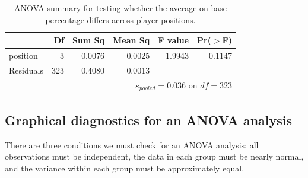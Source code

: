 \begin{table}[ht]
\centering
\begin{tabular}{lrrrrr}
  \hline
 & Df & Sum Sq & Mean Sq & F value & Pr($>$F) \\ 
  \hline
position & 3 & 0.0076 & 0.0025 & 1.9943 & 0.1147 \\ 
  Residuals & 323 & 0.4080 & 0.0013 &  &  \\    \hline
\multicolumn{6}{r}{$s_{pooled} = 0.036$ on $df=323$}
\end{tabular}
\caption{ANOVA summary for testing whether the average on-base percentage differs across player positions.}
\label{anovaSummaryTableForOBPAgainstPosition}
\end{table}


\subsection{Graphical diagnostics for an ANOVA analysis}

There are three conditions we must check for an ANOVA analysis: all observations must be independent, the data in each group must be nearly normal, and the variance within each group must be approximately equal.

